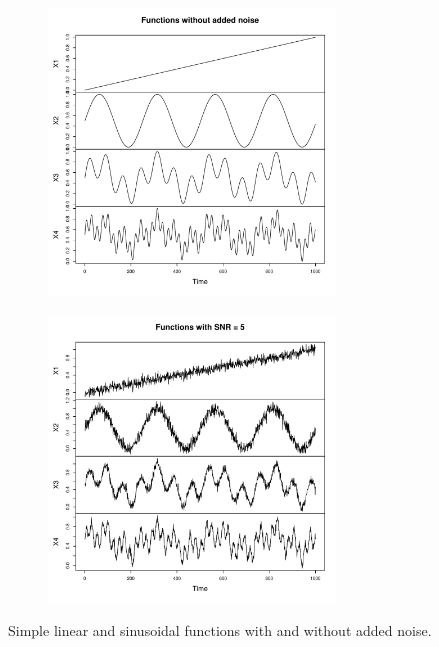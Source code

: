 \begin{figure}[h]
  \begin{subfigure}[b]{0.45\textwidth}
\includegraphics[width = 0.9\linewidth, height = 3in]{./figs/coeff-interp-simple-functions0.pdf}
  \end{subfigure}
  \hfill
  \begin{subfigure}[b]{0.45\textwidth}
  \includegraphics[width = 0.9\linewidth, height = 3in]{./figs/coeff-interp-simple-functions1.pdf}
  \end{subfigure}
  \caption{Simple linear and sinusoidal functions with and 
  without added noise.}
     \label{fig:simple-functions}
\end{figure}

